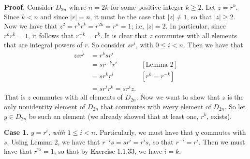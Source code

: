 \documentclass[9pt]{article}
\begin{document}
\begin{enumerate}
      \textbf{Proof.} Consider $D_{2n}$ where $n = 2k$ for some positive integer
      $k \ge 2$. Let $z = r^k$. Since $k < n$ and since $|r| = n$, it must be
      the case that $|z| \neq 1$, so that $|z| \ge 2$. Now we have that
      $z^2 = r^kr^k = r^{2k} = r^n = 1$; i.e, $|z| = 2$. In particular, since
      $r^kr^k = 1$, it follows that $r^{-k} = r^k$. It is clear that $z$
      commutes with all elements that are integral powers of $r$. So consider
      $sr^i$, with $0 \le i < n$. Then we have that
      \begin{align*}
         zsr^i &= r^ksr^i \\
               &= sr^{-k}r^i  &[\text{Lemma 2}] \\
               &= sr^kr^i     &[r^k = r^{-k}] \\
               &= sr^ir^k = sr^iz.
      \end{align*}
      That is $z$ commutes with all elements of $D_{2n}$. Now we want to show
      that $z$ is the only nonidentity element of $D_{2n}$ that commutes with
      every element of $D_{2n}$. So let $y \in D_{2n}$ be such an element (we
      already showed that at least one, $r^k$, exists).
      
      \textbf{Case 1.} \textit{$y = r^i$, with $1 \le i < n$.} Particularly, we
      must have that $y$ commutes with $s$. Using Lemma 2, we have that
      $r^{-i}s = sr^i = r^is$, so that $r^{-i} = r^i$. Then we must have that
      $r^{2i} = 1$, so that by Exercise 1.1.33, we have $i = k$.
      

\end{enumerate}
\end{document}

